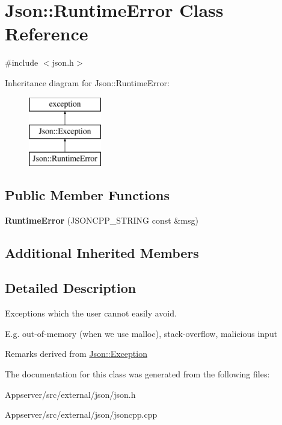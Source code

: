 \hypertarget{classJson_1_1RuntimeError}{}\section{Json\+:\+:Runtime\+Error Class Reference}
\label{classJson_1_1RuntimeError}


{\ttfamily \#include $<$json.\+h$>$}

Inheritance diagram for Json\+:\+:Runtime\+Error\+:\begin{figure}[H]
\begin{center}
\leavevmode
\includegraphics[height=3.000000cm]{classJson_1_1RuntimeError}
\end{center}
\end{figure}
\subsection*{Public Member Functions}
\begin{DoxyCompactItemize}
\item 
{\bfseries Runtime\+Error} (J\+S\+O\+N\+C\+P\+P\+\_\+\+S\+T\+R\+I\+NG const \&msg)\hypertarget{classJson_1_1RuntimeError_a0f6445dc345ce0a703610b6e893fee40}{}\label{classJson_1_1RuntimeError_a0f6445dc345ce0a703610b6e893fee40}

\end{DoxyCompactItemize}
\subsection*{Additional Inherited Members}


\subsection{Detailed Description}
Exceptions which the user cannot easily avoid.

E.\+g. out-\/of-\/memory (when we use malloc), stack-\/overflow, malicious input

\begin{DoxyRemark}{Remarks}
derived from \hyperlink{classJson_1_1Exception}{Json\+::\+Exception} 
\end{DoxyRemark}


The documentation for this class was generated from the following files\+:\begin{DoxyCompactItemize}
\item 
Appserver/src/external/json/json.\+h\item 
Appserver/src/external/json/jsoncpp.\+cpp\end{DoxyCompactItemize}
